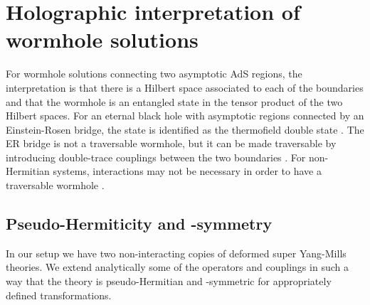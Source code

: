 \section{Holographic interpretation of wormhole solutions}\label{sec:PTsym}

For wormhole solutions connecting two asymptotic AdS regions, the interpretation is that there is a Hilbert space associated to each of the boundaries and that the wormhole is an entangled state in the tensor product of the two Hilbert spaces. For an eternal black hole with asymptotic regions connected by an Einstein-Rosen bridge, the state is identified as the thermofield double state \cite{Maldacena:2001kr}. The ER bridge is not a traversable wormhole, but it can be made traversable by introducing double-trace couplings between the two boundaries \cite{Gao:2016bin}. For non-Hermitian systems, interactions may not be necessary in order to have a traversable wormhole \cite{Harper:2025lav}.  

\subsection{Pseudo-Hermiticity and \PT-symmetry}
%

In our setup we have two non-interacting copies of deformed super Yang-Mills theories. We extend analytically some of the operators and couplings in such a way that the theory is pseudo-Hermitian and \PT-symmetric for appropriately defined transformations. 

